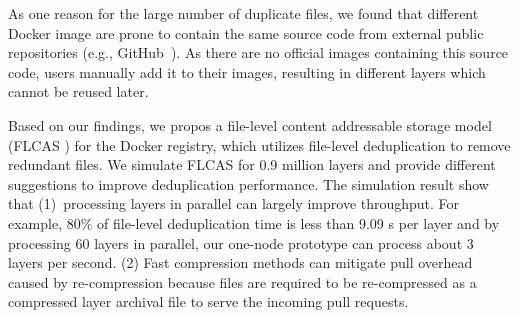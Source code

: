 As one reason for the large number of duplicate files, we found that different Docker image are prone
to contain the same source code from external public repositories (e.g., GitHub~\cite{github}). As
there are no official images containing this source code, users manually add it to their images,
resulting in different layers which cannot be reused later.  

Based on our findings, we propos a file-level content addressable storage model (FLCAS
) for the Docker registry, which utilizes
file-level deduplication to remove redundant files. 
%
We simulate FLCAS for 0.9 million layers and provide different suggestions to improve
deduplication performance.
%
%
The simulation result show that (1)~processing layers in
parallel can largely improve throughput. For example, 80\% of file-level deduplication time is
less than 9.09 s per layer and by processing 60 layers in parallel, our one-node
prototype can process about 3 layers per second.
%
%
(2) Fast compression methods can mitigate pull overhead caused by re-compression
because files are required to be re-compressed as a compressed layer archival file to serve
the incoming pull requests.
%



